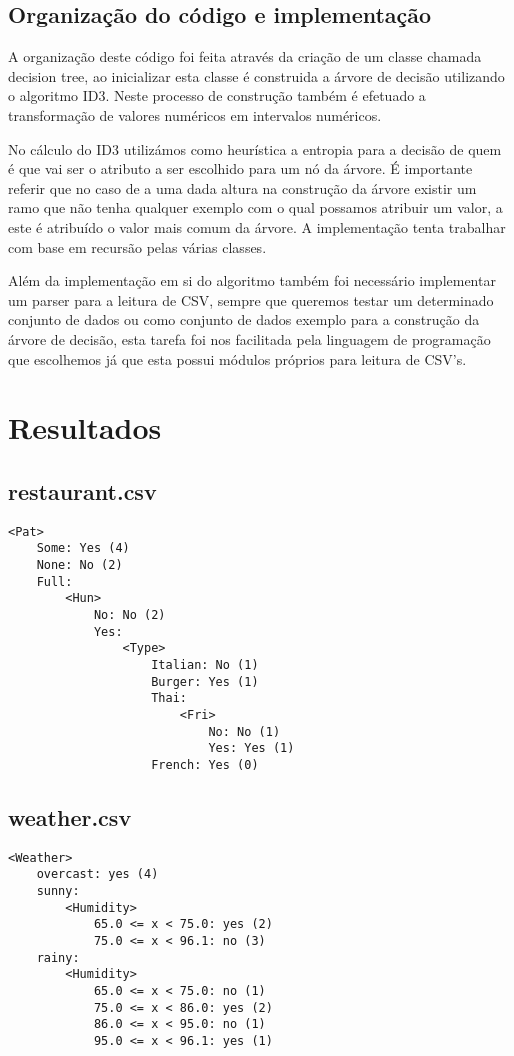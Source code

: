\documentclass[12pt,a4paper]{article}
\begin{document}
\subsection{Organização do código e implementação}
A organização deste código foi feita através da criação de um classe chamada decision tree, ao inicializar esta classe é construida a árvore de decisão utilizando o algoritmo ID3. Neste processo de construção também é efetuado a transformação de valores numéricos em intervalos numéricos. 

No cálculo do ID3 utilizámos como heurística a entropia para a decisão de quem é que vai ser o atributo a ser escolhido para um nó da árvore. É importante referir que no caso de a uma dada altura na construção da árvore existir um ramo que não tenha qualquer exemplo com o qual possamos atribuir um valor, a este é atribuído o valor mais comum da árvore. A implementação tenta trabalhar com base em recursão pelas várias classes.

Além da implementação em si do algoritmo também foi necessário implementar um parser para a leitura de CSV, sempre que queremos testar um determinado conjunto de dados ou como conjunto de dados exemplo para a construção da árvore de decisão, esta tarefa foi nos facilitada pela  linguagem de programação que escolhemos já que esta possui módulos próprios para leitura de CSV's.  

\section{Resultados}

\subsection{restaurant.csv}
\begin{lstlisting}
<Pat>
	Some: Yes (4)
	None: No (2)
	Full:
		<Hun>
			No: No (2)
			Yes:
				<Type>
					Italian: No (1)
					Burger: Yes (1)
					Thai:
						<Fri>
							No: No (1)
							Yes: Yes (1)
					French: Yes (0)
\end{lstlisting}

\subsection{weather.csv}
\begin{lstlisting}
<Weather>
	overcast: yes (4)
	sunny:
		<Humidity>
			65.0 <= x < 75.0: yes (2)
			75.0 <= x < 96.1: no (3)
	rainy:
		<Humidity>
			65.0 <= x < 75.0: no (1)
			75.0 <= x < 86.0: yes (2)
			86.0 <= x < 95.0: no (1)
			95.0 <= x < 96.1: yes (1)
\end{lstlisting}
\end{document}
